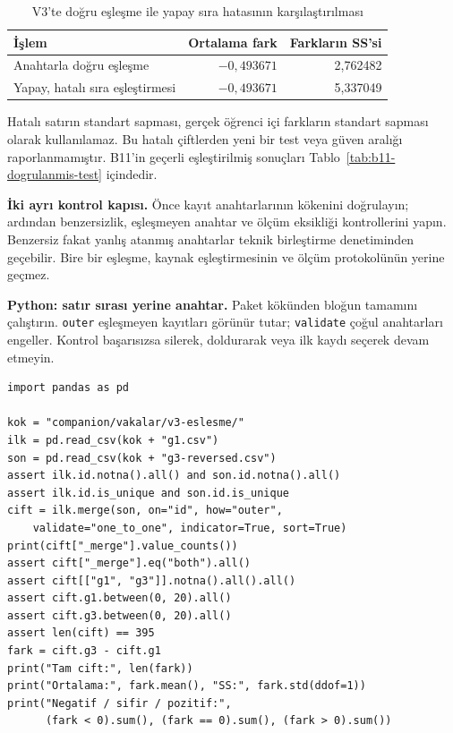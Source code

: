 \begin{table}[H]
\centering
\caption{V3'te doğru eşleşme ile yapay sıra hatasının karşılaştırılması}
\label{tab:v3-sira-hatasi}
\begin{tabular}{@{}lrr@{}}
\toprule
İşlem & Ortalama fark & Farkların SS'si \\
\midrule
Anahtarla doğru eşleşme & $-0{,}493671$ & 2,762482 \\
Yapay, hatalı sıra eşleştirmesi & $-0{,}493671$ & 5,337049 \\
\bottomrule
\end{tabular}
\end{table}
Hatalı satırın standart sapması, gerçek öğrenci içi farkların standart
sapması olarak kullanılamaz. Bu hatalı çiftlerden yeni bir test veya
güven aralığı raporlanmamıştır. B11'in geçerli eşleştirilmiş sonuçları
Tablo~\ref{tab:b11-dogrulanmis-test} içindedir.

\textbf{İki ayrı kontrol kapısı.} Önce kayıt anahtarlarının kökenini
doğrulayın; ardından benzersizlik, eşleşmeyen anahtar ve ölçüm
eksikliği kontrollerini yapın. Benzersiz fakat yanlış atanmış anahtarlar
teknik birleştirme denetiminden geçebilir. Bire bir eşleşme, kaynak
eşleştirmesinin ve ölçüm protokolünün yerine geçmez.

\par\noindent\begin{minipage}{\linewidth}
\textbf{Python: satır sırası yerine anahtar.} Paket kökünden bloğun
tamamını çalıştırın. \texttt{outer} eşleşmeyen kayıtları görünür
tutar; \texttt{validate} çoğul anahtarları engeller. Kontrol başarısızsa
silerek, doldurarak veya ilk kaydı seçerek devam etmeyin.

\begin{lstlisting}[style=prismPythonApp]
import pandas as pd

kok = "companion/vakalar/v3-eslesme/"
ilk = pd.read_csv(kok + "g1.csv")
son = pd.read_csv(kok + "g3-reversed.csv")
assert ilk.id.notna().all() and son.id.notna().all()
assert ilk.id.is_unique and son.id.is_unique
cift = ilk.merge(son, on="id", how="outer",
    validate="one_to_one", indicator=True, sort=True)
print(cift["_merge"].value_counts())
assert cift["_merge"].eq("both").all()
assert cift[["g1", "g3"]].notna().all().all()
assert cift.g1.between(0, 20).all()
assert cift.g3.between(0, 20).all()
assert len(cift) == 395
fark = cift.g3 - cift.g1
print("Tam cift:", len(fark))
print("Ortalama:", fark.mean(), "SS:", fark.std(ddof=1))
print("Negatif / sifir / pozitif:",
      (fark < 0).sum(), (fark == 0).sum(), (fark > 0).sum())
\end{lstlisting}
\end{minipage}\par

